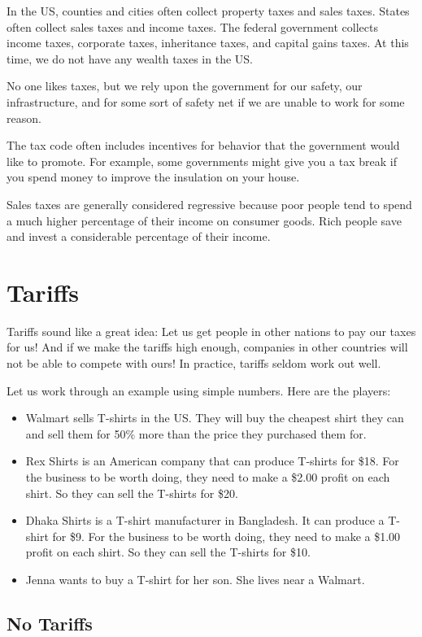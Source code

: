 In the US, counties and cities often collect property taxes and sales taxes.  States often collect sales taxes and income taxes.  The federal government collects income taxes, corporate taxes, inheritance taxes, and capital gains taxes. At this time, we do not have any wealth taxes in the US.

No one likes taxes, but we rely upon the government for our safety, our infrastructure, and for some sort of safety net if we are unable to work for some reason.

The tax code often includes incentives for behavior that the government would like to promote. For example, some governments might give you a tax break if you spend money to improve the insulation on your house.

Sales taxes are generally considered regressive because poor people tend to spend a much higher percentage of their income on consumer goods. Rich people save and invest a considerable percentage of their income.

\section{Tariffs}

Tariffs sound like a great idea: Let us get people in other nations to pay our taxes for us! And if we make the tariffs high enough, companies in other countries will not be able to compete with ours! In practice, tariffs seldom work out well.

Let us work through an example using simple numbers. Here are the players:
\begin{itemize}
\item Walmart sells T-shirts in the US. They will buy the cheapest shirt they can and sell them for 50\% more than the price they purchased them for.
\item Rex Shirts is an American company that can produce T-shirts for \$18. For the business to be worth doing, they need to make a \$2.00 profit on each shirt. So they can sell the T-shirts for \$20.
\item Dhaka Shirts is a T-shirt manufacturer in Bangladesh.  It can produce a T-shirt for \$9. For the business to be worth doing, they need to make a \$1.00 profit on each shirt. So they can sell the T-shirts for \$10.
\item Jenna wants to buy a T-shirt for her son. She lives near a Walmart.
\end{itemize}

\subsection{No Tariffs}

